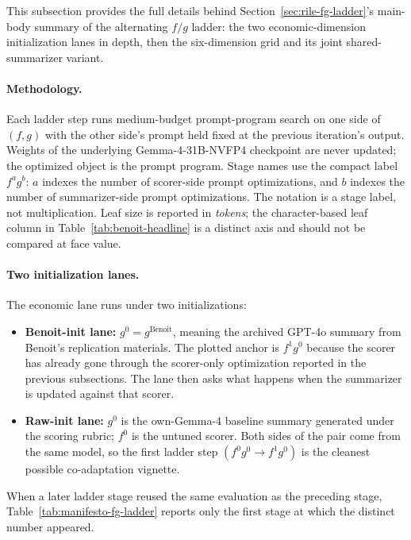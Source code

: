 This subsection provides the full details behind
Section~\ref{sec:rile-fg-ladder}'s main-body summary of the alternating
$f/g$ ladder: the two economic-dimension initialization lanes in
depth, then the six-dimension grid and its joint shared-summarizer
variant.

\paragraph{Methodology.} Each ladder step runs medium-budget
prompt-program search on one side of $(f, g)$ with the other side's
prompt held fixed at the previous iteration's output. Weights of the
underlying Gemma-4-31B-NVFP4 checkpoint are never updated; the optimized
object is the prompt program. Stage names use the compact label
$f^a g^b$: $a$ indexes the number of scorer-side prompt optimizations,
and $b$ indexes the number of summarizer-side prompt optimizations. The
notation is a stage label, not multiplication. Leaf size is reported in
\emph{tokens}; the character-based leaf column in
Table~\ref{tab:benoit-headline} is a distinct axis and should not be
compared at face value.

\paragraph{Two initialization lanes.} The economic lane runs under
two initializations:
\begin{itemize}[leftmargin=1.5em]
    \item \textbf{Benoit-init lane:} $g^0 = g^{\mathrm{Benoit}}$, meaning the
          archived GPT-4o summary from Benoit's replication materials.
          The plotted anchor is $f^1 g^0$ because the scorer has already
          gone through the scorer-only optimization reported in the
          previous subsections. The lane then asks what happens when the
          summarizer is updated against that scorer.
    \item \textbf{Raw-init lane:} $g^0$ is the
          own-Gemma-4 baseline summary generated under the scoring
          rubric; $f^0$ is the untuned scorer. Both sides of the
          pair come from the same model, so the first ladder
          step $(f^0 g^0 \to f^1 g^0)$ is the cleanest possible
          co-adaptation vignette.
\end{itemize}
When a later ladder stage reused the same evaluation as the preceding
stage, Table~\ref{tab:manifesto-fg-ladder} reports only the first stage
at which the distinct number appeared.

